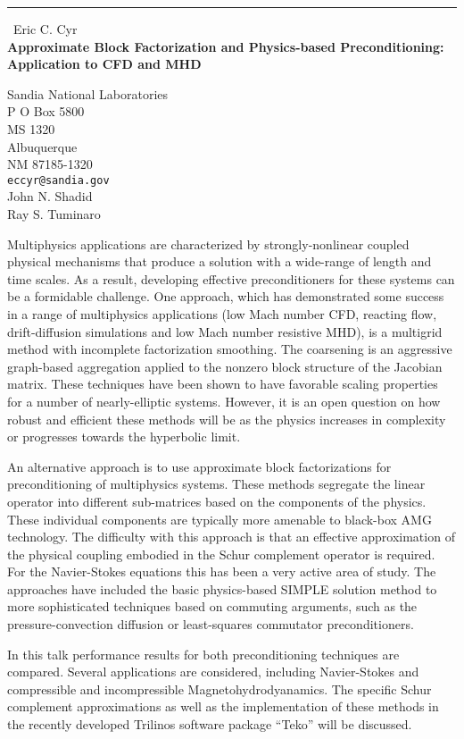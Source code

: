 \documentclass{report}
\begin{document}
\begin{center}
\rule{6in}{1pt} \
{\large Eric C. Cyr \\
{\bf Approximate Block Factorization and Physics-based Preconditioning: Application to CFD and MHD}}

Sandia National Laboratories \\ P O Box 5800 \\ MS 1320 \\ Albuquerque \\ NM 87185-1320
\\
{\tt eccyr@sandia.gov}\\
John N. Shadid\\
Ray S. Tuminaro\end{center}

Multiphysics applications are characterized by strongly-nonlinear coupled
physical mechanisms that produce a solution with a wide-range of length
and time scales. As a result, developing effective preconditioners for
these systems can be a formidable challenge. One approach, which has
demonstrated some success in a range of multiphysics applications (low
Mach number CFD, reacting flow, drift-diffusion simulations and low Mach
number resistive MHD), is a multigrid method with incomplete
factorization smoothing. The coarsening is an aggressive graph-based
aggregation applied to the nonzero block structure of the Jacobian
matrix. These techniques have been shown to have favorable scaling
properties for a number of nearly-elliptic systems. However, it is an
open question on how robust and efficient these methods will be as the
physics increases in complexity or progresses towards the hyperbolic
limit.

An alternative approach is to use approximate block factorizations for
preconditioning of multiphysics systems. These methods segregate the
linear operator into different sub-matrices based on the components of
the physics. These individual components are typically more amenable to
black-box AMG technology. The difficulty with this approach is that an
effective approximation of the physical coupling embodied in the Schur
complement operator is required. For the Navier-Stokes equations this has
been a very active area of study. The approaches have included the basic
physics-based SIMPLE solution method to more sophisticated techniques
based on commuting arguments, such as the pressure-convection diffusion
or least-squares commutator preconditioners.

In this talk performance results for both preconditioning techniques are
compared. Several applications are considered, including Navier-Stokes
and compressible and incompressible Magnetohydrodyanamics. The specific
Schur complement approximations as well as the implementation of these
methods in the recently developed Trilinos software package ``Teko'' will
be discussed.
\end{document}

